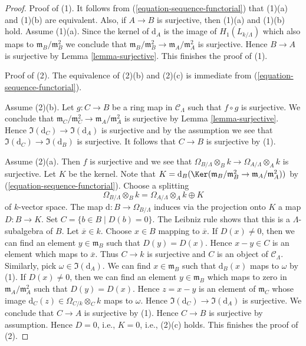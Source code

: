 \begin{proof}
Proof of (1). It follows from (\ref{equation-sequence-functorial})
that (1)(a) and (1)(b) are equivalent. Also, if
$A \to B$ is surjective, then (1)(a) and (1)(b) hold. Assume (1)(a).
Since the kernel of $\text{d}_A$ is the image of
$H_1(L_{k/\Lambda})$ which also maps to
$\mathfrak m_B/\mathfrak m_B^2$ we conclude that
$\mathfrak m_B/\mathfrak m_B^2 \to \mathfrak m_A/\mathfrak m_A^2$
is surjective. Hence $B \to A$ is surjective by
Lemma \ref{lemma-surjective}. This finishes the proof of (1).

\medskip\noindent
Proof of (2). The equivalence of (2)(b) and (2)(c) is immediate from
(\ref{equation-sequence-functorial}).

\medskip\noindent
Assume (2)(b). Let $g : C \to B$ be a ring map in $\mathcal{C}_\Lambda$
such that $f \circ g$ is surjective. We conclude that
$\mathfrak m_C/\mathfrak m_C^2 \to \mathfrak m_A/\mathfrak m_A^2$
is surjective by
Lemma \ref{lemma-surjective}.
Hence
$\Im(\text{d}_C) \to \Im(\text{d}_A)$ is surjective
and by the assumption we see that
$\Im(\text{d}_C) \to \Im(\text{d}_B)$ is surjective.
It follows that $C \to B$ is surjective by (1).

\medskip\noindent
Assume (2)(a). Then $f$ is surjective and we see that
$\Omega_{B/\Lambda} \otimes_B k \to \Omega_{A/\Lambda} \otimes_A k$
is surjective. Let $K$ be the kernel. Note that
$K = \text{d}_B(\Ker(\mathfrak m_B/\mathfrak m_B^2 \to
\mathfrak m_A/\mathfrak m_A^2))$ by (\ref{equation-sequence-functorial}).
Choose a splitting
$$
\Omega_{B/\Lambda} \otimes_B k =
\Omega_{A/\Lambda} \otimes_A k \oplus K
$$
of $k$-vector space. The map $\text{d} : B \to \Omega_{B/\Lambda}$
induces via the projection onto $K$ a map $D : B \to K$. Set
$C = \{b \in B \mid D(b) = 0\}$. The Leibniz rule shows that this is
a $\Lambda$-subalgebra of $B$. Let $\overline{x} \in k$. Choose $x \in B$
mapping to $\overline{x}$. If $D(x) \not = 0$, then we can find an element
$y \in \mathfrak m_B$ such that $D(y) = D(x)$. Hence $x - y \in C$ is
an element which maps to $\overline{x}$. Thus $C \to k$ is surjective
and $C$ is an object of $\mathcal{C}_\Lambda$. Similarly, pick
$\omega \in \Im(\text{d}_A)$. We can find $x \in \mathfrak m_B$
such that $\text{d}_B(x)$ maps to $\omega$ by (1). If $D(x) \not = 0$, then
we can find an element $y \in \mathfrak m_B$ which maps to zero
in $\mathfrak m_A/\mathfrak m_A^2$ such that $D(y) = D(x)$.
Hence $z = x - y$ is an element of $\mathfrak m_C$ whose
image $\text{d}_C(z) \in \Omega_{C/k} \otimes_C k$ maps to $\omega$.
Hence $\Im(\text{d}_C) \to \Im(\text{d}_A)$ is surjective.
We conclude that $C \to A$ is surjective by (1). Hence $C \to B$ is
surjective by assumption. Hence $D = 0$, i.e., $K = 0$, i.e., (2)(c) holds.
This finishes the proof of (2).


\end{proof}
